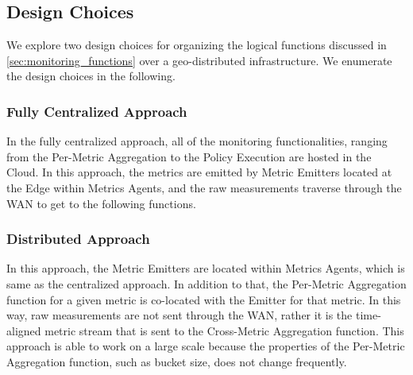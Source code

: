 \subsection{Design Choices}
We explore two design choices for organizing the logical functions discussed in \cref{sec:monitoring_functions} over a geo-distributed infrastructure. We enumerate the design choices in the following.

\subsubsection{Fully Centralized Approach}
In the fully centralized approach, all of the monitoring functionalities, ranging from the Per-Metric Aggregation to the Policy Execution are hosted in the Cloud. In this approach, the metrics are emitted by Metric Emitters located at the Edge within Metrics Agents, and the raw measurements traverse through the WAN to get to the following functions. 

\subsubsection{Distributed Approach}
In this approach, the Metric Emitters are located within Metrics Agents, which is same as the centralized approach. In addition to that, the Per-Metric Aggregation function for a given metric is co-located with the Emitter for that metric. In this way, raw measurements are not sent through the WAN, rather it is the time-aligned metric stream that is sent to the Cross-Metric Aggregation function. This approach is able to work on a large scale because the properties of the Per-Metric Aggregation function, such as bucket size, does not change frequently.

